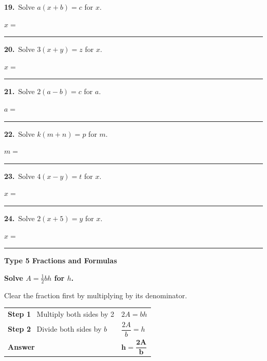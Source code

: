 \documentclass[11pt,letterpaper]{article}
\newcommand{\topicbar}[1]{\needspace{4.5cm}\par\vspace{5mm}
  \begin{tcolorbox}[enhanced,colback=fmtitle,colframe=fmtitle,arc=2mm,left=4mm,top=1.5mm,bottom=1.5mm]
  \color{white}\bfseries\large #1
  \end{tcolorbox}}
\begin{document}
\needspace{3.5cm}\par\vspace{3mm}\noindent \begin{minipage}[t][3.0cm]{0.48\linewidth}\raggedright{\color{fmturn}\bfseries 19.}\ Solve $a(x + b) = c$ for $x$.\par\vfill\hfill $x = $\ \rule{3.2cm}{0.4pt}\end{minipage}\hfill \begin{minipage}[t][3.0cm]{0.48\linewidth}\raggedright{\color{fmturn}\bfseries 20.}\ Solve $3(x + y) = z$ for $x$.\par\vfill\hfill $x = $\ \rule{3.2cm}{0.4pt}\end{minipage}\par
\needspace{3.5cm}\par\vspace{3mm}\noindent \begin{minipage}[t][3.0cm]{0.48\linewidth}\raggedright{\color{fmturn}\bfseries 21.}\ Solve $2(a - b) = c$ for $a$.\par\vfill\hfill $a = $\ \rule{3.2cm}{0.4pt}\end{minipage}\hfill \begin{minipage}[t][3.0cm]{0.48\linewidth}\raggedright{\color{fmturn}\bfseries 22.}\ Solve $k(m + n) = p$ for $m$.\par\vfill\hfill $m = $\ \rule{3.2cm}{0.4pt}\end{minipage}\par
\needspace{3.5cm}\par\vspace{3mm}\noindent \begin{minipage}[t][3.0cm]{0.48\linewidth}\raggedright{\color{fmturn}\bfseries 23.}\ Solve $4(x - y) = t$ for $x$.\par\vfill\hfill $x = $\ \rule{3.2cm}{0.4pt}\end{minipage}\hfill \begin{minipage}[t][3.0cm]{0.48\linewidth}\raggedright{\color{fmturn}\bfseries 24.}\ Solve $2(x + 5) = y$ for $x$.\par\vfill\hfill $x = $\ \rule{3.2cm}{0.4pt}\end{minipage}\par
\needspace{9cm}\topicbar{Type 5 \quad Fractions and Formulas}
\begin{watchme}\textbf{Solve $A = \tfrac12 bh$ for $h$.}\par\vspace{1mm}
Clear the fraction first by multiplying by its denominator.\par\vspace{1mm}
\renewcommand{\arraystretch}{2.1}\begin{tabular}{@{}l l@{}}
\textbf{Step 1} \ Multiply both sides by 2 & $2A = bh$\\
\textbf{Step 2} \ Divide both sides by $b$ & $\dfrac{2A}{b} = h$\\
\textbf{Answer} & $\boldsymbol{h = \dfrac{2A}{b}}$
\end{tabular}\end{watchme}
\end{document}
